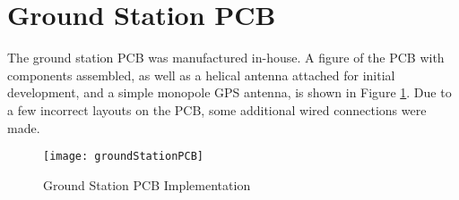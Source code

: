 \graphicspath{{./figures}}

\section{Ground Station PCB}

The ground station PCB was manufactured in-house. A figure of the PCB with components assembled, as well as a helical antenna attached for initial development, and a simple monopole GPS antenna, is shown in Figure \ref{fig:groundStationPCB}. Due to a few incorrect layouts on the PCB, some additional wired connections were made.

\begin{figure}[!htb]
  \centering
  \texttt{[image: groundStationPCB]}
  \caption{Ground Station PCB Implementation}
  \label{fig:groundStationPCB}
\end{figure}